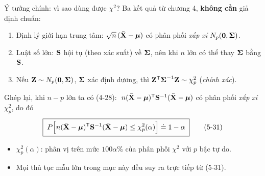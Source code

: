 \begin{frame}{Ý tưởng chính: vì sao dùng được \texorpdfstring{\(\chi^2\)}{chi-square}?}
  Ba kết quả từ chương 4, \textbf{không cần} giả định chuẩn:
  \begin{enumerate}
    \item Định lý giới hạn trung tâm: \(\sqrt{n}\,(\bar{\mathbf{X}}-\boldsymbol{\mu})\) có phân phối \emph{xấp xỉ} \(N_p(\mathbf{0},\boldsymbol{\Sigma})\).
    \item Luật số lớn: \(\mathbf{S}\) hội tụ (theo xác suất) về \(\boldsymbol{\Sigma}\), nên khi \(n\) lớn có thể thay \(\boldsymbol{\Sigma}\) bằng \(\mathbf{S}\).
    \item Nếu \(\mathbf{Z}\sim N_p(\mathbf{0},\boldsymbol{\Sigma})\), \(\boldsymbol{\Sigma}\) xác định dương, thì \(\mathbf{Z}^{\mathsf T}\boldsymbol{\Sigma}^{-1}\mathbf{Z}\sim\chi^2_p\) (\emph{chính xác}).
  \end{enumerate}
  Ghép lại, khi \(n-p\) lớn ta có (4-28):
  \(\;n(\bar{\mathbf{X}}-\boldsymbol{\mu})^{\mathsf T}\mathbf{S}^{-1}(\bar{\mathbf{X}}-\boldsymbol{\mu})\)
  có phân phối \emph{xấp xỉ} \(\chi^2_p\), do đó
  \begin{equation*}
    \boxed{\;P\Bigl[n(\bar{\mathbf{X}}-\boldsymbol{\mu})^{\mathsf T}\mathbf{S}^{-1}(\bar{\mathbf{X}}-\boldsymbol{\mu})
    \le \chi^2_p(\alpha)\Bigr] \doteq 1-\alpha\;}
    \tag{5-31}
  \end{equation*}
  \begin{itemize}
    \item \(\chi^2_p(\alpha)\): phân vị trên mức \(100\alpha\%\) của phân phối \(\chi^2\) với \(p\) bậc tự do.
    \item Mọi thủ tục mẫu lớn trong mục này đều suy ra trực tiếp từ (5-31).
  \end{itemize}
\end{frame}

